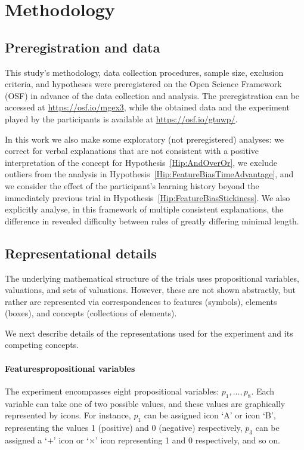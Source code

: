 \section{Methodology}\label{Sec:AdditionalMethodology}


\subsection{Preregistration and data}
This study's methodology, data collection procedures, sample size, exclusion criteria, and hypotheses were preregistered on the Open Science Framework (OSF) in advance of the data collection and analysis. The preregistration can be accessed at \url{https://osf.io/mgex3}, while the obtained data and the experiment played by the participants is available at \url{https://osf.io/gtuwp/}.

In this work we also make some exploratory (not preregistered) analyses: we correct for verbal explanations that are not consistent with a positive interpretation of the concept for Hypothesis~\ref{Hip:AndOverOr}, we exclude outliers from the analysis in Hypothesis~\ref{Hip:FeatureBiasTimeAdvantage}, and we consider the effect of the participant's learning history  beyond the immediately previous trial in Hypothesis~\ref{Hip:FeatureBiasStickiness}. We also explicitly analyse, in this framework of multiple consistent explanations, the difference in revealed difficulty between rules of greatly differing minimal length.


\subsection{Representational details}\label{sub:experimentdetails} 


The underlying mathematical structure of the trials uses propositional variables, valuations, and sets of valuations. However, these are not shown abstractly, but rather are represented via correspondences to features (symbols), elements (boxes), and concepts (collections of elements). 

We next describe details of the representations used for the experiment and its competing concepts.


\paragraph{Features\textemdash propositional variables}
The experiment encompasses eight propositional variables: $p_1,\dots,p_8$. Each variable can take one of two possible values, and these values are graphically represented by icons. For instance, $p_1$ can be assigned icon `A' or icon `B', representing the values 1 (positive) and 0 (negative) respectively, $p_3$ can be assigned a `$+$' icon or `$\times$' icon  representing 1 and 0 respectively, and so on. 

